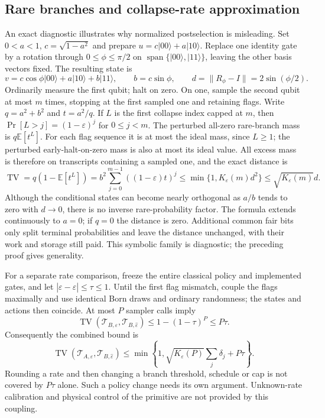 \documentclass[11pt]{article}
\theoremstyle{remark}
\newcommand{\eps}{\varepsilon}
\newcommand{\ket}[1]{\lvert #1\rangle}
\begin{document}
\subsection{Rare branches and collapse-rate approximation}
An exact diagnostic illustrates why normalized postselection is misleading.
Set $0<a<1$, $c=\sqrt{1-a^2}$ and prepare
$u=c\ket{00}+a\ket{10}$. Replace one identity gate by a rotation through
$0\le\phi\le\pi/2$ on $\operatorname{span}\{\ket{00},\ket{11}\}$,
leaving the other basis vectors fixed. The resulting state is
\[
 v=c\cos\phi\ket{00}+a\ket{10}+b\ket{11},\qquad
 b=c\sin\phi,\qquad d=\|R_\phi-I\|=2\sin(\phi/2).
\]
Ordinarily measure the first qubit; halt on zero. On one, sample the second
qubit at most $m$ times, stopping at the first sampled one and retaining
flags. Write $q=a^2+b^2$ and $t=a^2/q$. If $L$ is the first collapse
index capped at $m$, then $\Pr[L>j]=(1-\eps)^j$ for $0\le j<m$.
The perturbed all-zero rare-branch mass is $q\mathbb E[t^L]$.
For each flag sequence it is at most the ideal mass, since $L\ge1$;
the perturbed early-halt-on-zero mass is also at most its ideal value.
All excess mass is therefore on transcripts containing a sampled one,
and the exact distance is
\begin{equation}\label{eq:rare-precision}
 \operatorname{TV}=q(1-\mathbb E[t^L])
 =b^2\sum_{j=0}^{m-1}((1-\eps)t)^j
 \le\min\{1,K_\eps(m)d^2\}\le\sqrt{K_\eps(m)}d.
\end{equation}
Although the conditional states can become nearly orthogonal as $a/b$
tends to zero with $d\to0$, there is no inverse rare-probability factor.
The formula extends continuously to $a=0$; if $q=0$ the distance is zero.
Additional common fair bits only split terminal probabilities and leave
the distance unchanged, with their work and storage still paid. This
symbolic family is diagnostic; the preceding proof gives generality.

For a separate rate comparison, freeze the entire classical policy and
implemented gates, and let $|\eps-\hat\eps|\le\tau\le1$.
Until the first flag mismatch, couple the flags maximally and use identical
Born draws and ordinary randomness; the states and actions then coincide.
At most $P$ sampler calls imply
\begin{equation}\label{eq:rate-precision}
 \operatorname{TV}(\mathcal T_{B,\eps},\mathcal T_{B,\hat\eps})
 \le1-(1-\tau)^P\le P\tau.
\end{equation}
Consequently the combined bound is
\begin{equation}\label{eq:combined-precision}
 \operatorname{TV}(\mathcal T_{A,\eps},\mathcal T_{B,\hat\eps})
 \le\min\left\{1,\sqrt{K_\eps(P)}\sum_j\delta_j+P\tau\right\}.
\end{equation}
Rounding a rate and then changing a branch threshold, schedule or cap is
not covered by $P\tau$ alone. Such a policy change needs its own argument.
Unknown-rate calibration and physical control of the primitive are not
provided by this coupling.
\end{document}
